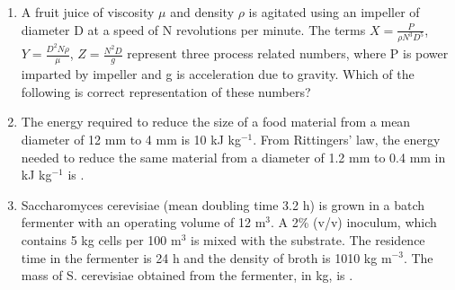\documentclass[a4paper,10pt]{article}
\begin{document}
\begin{enumerate}
    \hfill{}
    \begin{enumerate}[label=\Alph*)]
    \end{enumerate}

    \item A fruit juice of viscosity $\mu$ and density $\rho$ is agitated using an impeller of diameter D at a speed of N revolutions per minute. The terms $X = \frac{P}{\rho N^3 D^5}$, $Y = \frac{D^2 N \rho}{\mu}$, $Z = \frac{N^2 D}{g}$ represent three process related numbers, where P is power imparted by impeller and g is acceleration due to gravity. Which of the following is correct representation of these numbers?
    
    \hfill{}
    \begin{enumerate}[label=\Alph*)]
    \end{enumerate}
    
    \item The energy required to reduce the size of a food material from a mean diameter of 12 mm to 4 mm is 10 kJ kg$^{-1}$. From Rittingers' law, the energy needed to reduce the same material from a diameter of 1.2 mm to 0.4 mm in kJ kg$^{-1}$ is \underline{\hspace{2cm}}.
    
    \hfill{}
    
    \item Saccharomyces cerevisiae (mean doubling time 3.2 h) is grown in a batch fermenter with an operating volume of 12 m$^3$. A 2\% (v/v) inoculum, which contains 5 kg cells per 100 m$^3$ is mixed with the substrate. The residence time in the fermenter is 24 h and the density of broth is 1010 kg m$^{-3}$. The mass of S. cerevisiae obtained from the fermenter, in kg, is \underline{\hspace{2cm}}.
    

\end{enumerate}
\end{document}

